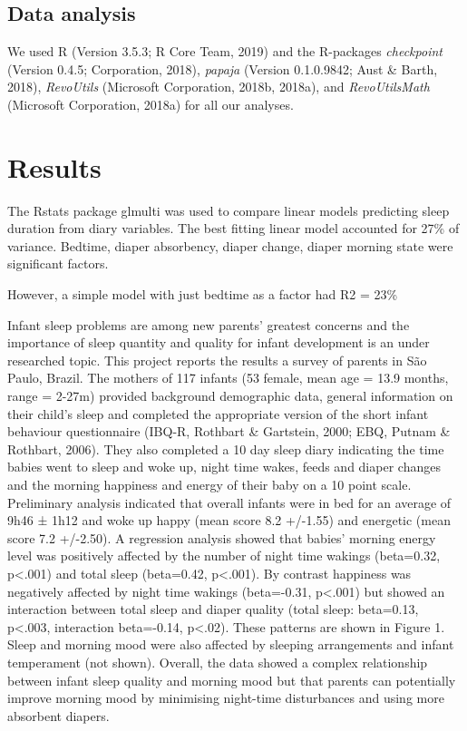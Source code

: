 \documentclass[man,floatsintext]{apa6}
\begin{document}
\hypertarget{data-analysis}{%
\subsection{Data analysis}\label{data-analysis}}

We used R (Version 3.5.3; R Core Team, 2019) and the R-packages \emph{checkpoint} (Version 0.4.5; Corporation, 2018), \emph{papaja} (Version 0.1.0.9842; Aust \& Barth, 2018), \emph{RevoUtils} (Microsoft Corporation, 2018b, 2018a), and \emph{RevoUtilsMath} (Microsoft Corporation, 2018a) for all our analyses.

\hypertarget{results}{%
\section{Results}\label{results}}

The Rstats package glmulti was used to compare linear models predicting sleep duration from diary variables. The best fitting linear model accounted for 27\% of variance. Bedtime, diaper absorbency, diaper change, diaper morning state were significant factors.

However, a simple model with just bedtime as a factor had R2 = 23\%

Infant sleep problems are among new parents' greatest concerns and the importance of sleep quantity and quality for infant development is an under researched topic. This project reports the results a survey of parents in São Paulo, Brazil. The mothers of 117 infants (53 female, mean age = 13.9 months, range = 2-27m) provided background demographic data, general information on their child's sleep and completed the appropriate version of the short infant behaviour questionnaire (IBQ-R, Rothbart \& Gartstein, 2000; EBQ, Putnam \& Rothbart, 2006). They also completed a 10 day sleep diary indicating the time babies went to sleep and woke up, night time wakes, feeds and diaper changes and the morning happiness and energy of their baby on a 10 point scale.\\
Preliminary analysis indicated that overall infants were in bed for an average of 9h46 ± 1h12 and woke up happy (mean score 8.2 +/-1.55) and energetic (mean score 7.2 +/-2.50). A regression analysis showed that babies' morning energy level was positively affected by the number of night time wakings (beta=0.32, p\textless{}.001) and total sleep (beta=0.42, p\textless{}.001). By contrast happiness was negatively affected by night time wakings (beta=-0.31, p\textless{}.001) but showed an interaction between total sleep and diaper quality (total sleep: beta=0.13, p\textless{}.003, interaction beta=-0.14, p\textless{}.02). These patterns are shown in Figure 1. Sleep and morning mood were also affected by sleeping arrangements and infant temperament (not shown).
Overall, the data showed a complex relationship between infant sleep quality and morning mood but that parents can potentially improve morning mood by minimising night-time disturbances and using more absorbent diapers.
\end{document}
